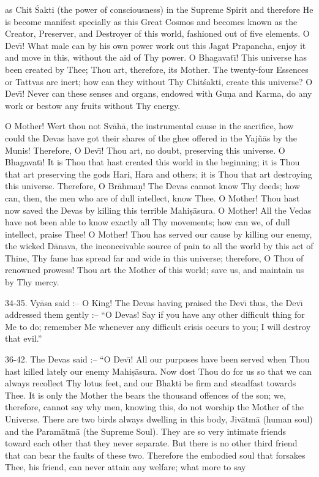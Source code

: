 as Chit \'Sakti (the power of consciousness) in the Supreme Spirit and therefore He is become manifest specially as this Great Cosmos and becomes known as the Creator, Preserver, and Destroyer of this world, fashioned out of five elements. O Dev\={\i}! What male can by his own power work out this Jagat Prapancha, enjoy it and move in this, without the aid of Thy power. O Bhagavat\={\i}! This universe has been created by Thee; Thou art, therefore, its Mother. The twenty-four Essences or Tattvas are inert; how can they without Thy Chit\'sakti, create this universe? O Dev\={\i}! Never can these senses and organs, endowed with Gu\d{n}a and Karma, do any work or bestow any fruits without Thy energy.

O Mother! Wert thou not Sv\=ah\=a, the instrumental cause in the sacrifice, how could the Devas have got their shares of the ghee offered in the Yaj\~n\=as by the Munis! Therefore, O Dev\={\i}! Thou art, no doubt, preserving this universe. O Bhagavat\={\i}! It is Thou that hast created this world in the beginning; it is Thou that art preserving the gods Hari, Hara and others; it is Thou that art destroying this universe. Therefore, O Br\=ahma\d{n}! The Devas cannot know Thy deeds; how can, then, the men who are of dull intellect, know Thee. O Mother! Thou hast now saved the Devas by killing this terrible Mahi\d{s}\=asura. O Mother! All the Vedas have not been able to know exactly all Thy movements; how can we, of dull intellect, praise Thee! O Mother! Thou has served our cause by killing our enemy, the wicked D\=anava, the inconceivable source of pain to all the world by this act of Thine, Thy fame has spread far and wide in this universe; therefore, O Thou of renowned prowess! Thou art the Mother of this world; save us, and maintain us by Thy mercy.

34-35. Vy\=asa said :-- O King! The Devas having praised the Dev\={\i} thus, the Dev\={\i} addressed them gently :-- ``O Devas! Say if you have any other difficult thing for Me to do; remember Me whenever any difficult crisis occurs to you; I will destroy that evil.''

36-42. The Devas said :-- ``O Dev\={\i}! All our purposes have been served when Thou hast killed lately our enemy Mahi\d{s}\=asura. Now dost Thou do for us so that we can always recollect Thy lotus feet, and our Bhakti be firm and steadfast towards Thee. It is only the Mother the bears the thousand offences of the son; we, therefore, cannot say why men, knowing this, do not worship the Mother of the Universe. There are two birds always dwelling in this body, Jiv\=atm\=a (human soul) and the Param\=atm\=a (the Supreme Soul). They are so very intimate friends toward each other that they never separate. But there is no other third friend that can bear the faults of these two. Therefore the embodied soul that forsakes Thee, his friend, can never attain any welfare; what more to say

